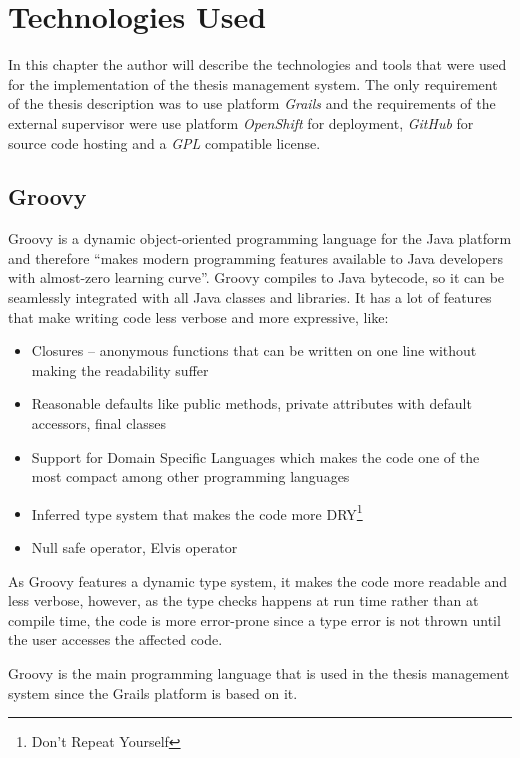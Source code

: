 \chapter{Technologies Used}

In this chapter the author will describe the technologies and tools that were used for the implementation of the thesis management system. The only requirement of the thesis description was to use platform \emph{Grails} and the requirements of the external supervisor were use platform \emph{OpenShift} for deployment, \emph{GitHub} for source code hosting and a \emph{GPL} compatible license.

\section{Groovy}

Groovy is a dynamic object-oriented programming language for the Java platform and therefore ``makes modern programming features available to Java developers with almost-zero learning curve''\cite{groovy-homepage}. Groovy compiles to Java bytecode, so it can be seamlessly integrated with all Java classes and libraries\cite{groovy-homepage}. It has a lot of features that make writing code less verbose and more expressive, like:

\begin{itemize}
    \item Closures -- anonymous functions that can be written on one line without making the readability suffer
    \item Reasonable defaults like public methods, private attributes with default accessors, final classes
    \item Support for Domain Specific Languages which makes the code one of the most compact among other programming languages
    \item Inferred type system that makes the code more DRY\footnote{Don't Repeat Yourself}
    \item Null safe operator, Elvis operator
\end{itemize}

As Groovy features a dynamic type system, it makes the code more readable and less verbose, however, as the type checks happens at run time rather than at compile time, the code is more error-prone since a type error is not thrown until the user accesses the affected code.

Groovy is the main programming language that is used in the thesis management system since the Grails platform is based on it.

